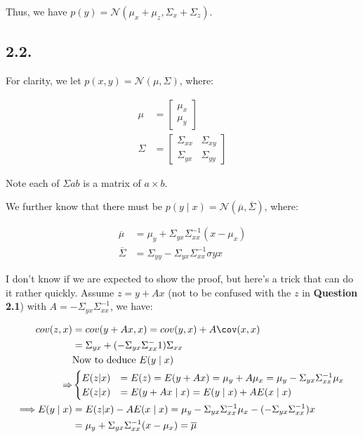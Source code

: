 \documentclass[11pt]{article}
\providecommand{\qbm}[1]{\begin{bmatrix} #1 \end{bmatrix}}
\begin{document}
Thus, we have $p(y) = \mathcal N(\mu_x+\mu_z,\Sigma_x+\Sigma_z)$.


\subsection*{2.2.}


For clarity, we let $p(x, y) = \mathcal N(\mu, \Sigma)$, where:

\begin{align*}
    \mu &= \qbm{\mu_x \\ \mu_y} \\
    \Sigma &= \qbm{\Sigma_{xx} & \Sigma_{xy} \\ \Sigma_{yx} & \Sigma_{yy}}
\end{align*}

Note each of $\Sigma{ab}$ is a matrix of $a \times b$.

We further know that there must be $p(y \mid x) = \mathcal N(\overline{\mu}, \overline{\Sigma})$, where:

\begin{align*}
    \overline{\mu} &= \mu_y + \Sigma_{yx} \Sigma_{xx}^{-1} (x - \mu_x) \\
    \overline{\Sigma} &= \Sigma_{yy} - \Sigma_{yx} \Sigma_{xx}^{-1}\sigma{yx}
\end{align*}

I don't know if we are expected to show the proof, but here's a trick that can do it rather quickly. Assume $z = y + Ax$ (not to be confused with the $z$ in \textbf{Question 2.1}) with $A = -\Sigma_{yx} \Sigma_{xx}^{-1}$, we have:

\begin{align*}
    cov(z, x) &= cov(y + Ax, x) = cov(y, x) + A \cov(x, x) \\
    &= \Sigma_{yx} + (-\Sigma_{yx} \Sigma_{xx}^-1) \Sigma_{xx} \\
    &\text{Now to deduce $E(y \mid x)$} \\
    \Rightarrow &\begin{cases}
        E(z | x) &= E(z) = E(y + Ax) = \mu_y + A \mu_x = \mu_y -\Sigma_{yx} \Sigma_{xx}^{-1} \mu_x \\
        E(z | x) &= E(y + Ax \mid x) = E(y \mid x) + A E(x \mid x) \\
    \end{cases} \\
    \Longrightarrow E(y \mid x) &= E(z | x) - A E(x \mid x) = \mu_y -\Sigma_{yx} \Sigma_{xx}^{-1} \mu_x - (-\Sigma_{yx} \Sigma_{xx}^{-1}) x \\
    &= \mu_y + \Sigma_{yx} \Sigma_{xx}^{-1} (x - \mu_x) = \overline{\mu}
\end{align*}
\end{document}
